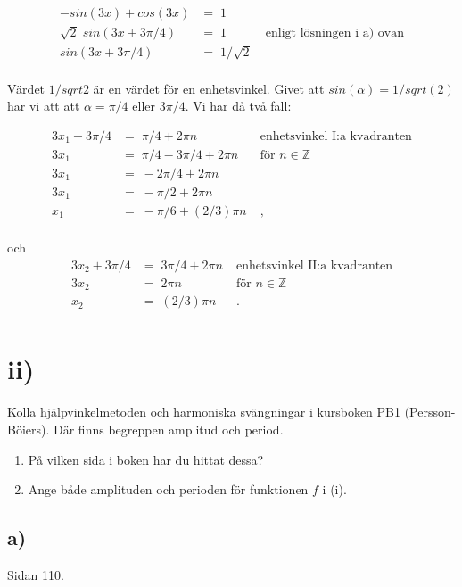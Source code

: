 \documentclass[a4paper, 11pt]{article}
\begin{document}
\begin{align*}
  -sin(3x) + cos(3x) &=\;  1 &\\
  \sqrt{2}\; sin(3x + 3\pi/4)  &=\; 1 &\;\text{enligt lösningen i a) ovan}\\
  sin(3x + 3\pi/4)  &=\; 1/\sqrt{2} &\;  \\
\end{align*}


Värdet $1/sqrt{2}$ är en värdet för en enhetsvinkel. Givet att $sin(\alpha) =
  1/sqrt(2)$ har vi att att $\alpha = \pi/4$ eller $3\pi/4$. Vi har då två fall:

\begin{align*}  
  3x_1 + 3\pi/4  &=\; \pi/4 + 2\pi n&\;  \text{enhetsvinkel I:a kvadranten}\\
  3x_1 &=\; \pi/4 - 3\pi/4 + 2\pi n&\;  \text{för\  }n \in \mathbb{Z}\\
  3x_1 &=\; -2\pi/4 + 2\pi n&\;   \\
  3x_1 &=\; -\pi/2 + 2\pi n&\;   \\
  x_1 &=\;  -\pi/6 + (2/3)\pi n&\;,   \\
\end{align*}

och
\begin{align*}  
  3x_2 + 3\pi/4  &=\; 3\pi/4 + 2\pi n&\; \text{enhetsvinkel II:a kvadranten} \\
  3x_2 &=\;  2\pi n&\;  \text{för\  }n \in \mathbb{Z}\\
  x_2 &=\;   (2/3)\pi n&\;.   \\
\end{align*}




\section*{ii)}

Kolla hjälpvinkelmetoden och harmoniska svängningar i kursboken PB1
(Persson-Böiers). Där finns begreppen amplitud och period.

\begin{enumerate}[label=\alph*]
\item På vilken sida i boken har du hittat dessa?
\item Ange både amplituden och perioden för funktionen $f$ i (i).
\end{enumerate}

\subsection*{a)}  Sidan 110.
\end{document}
